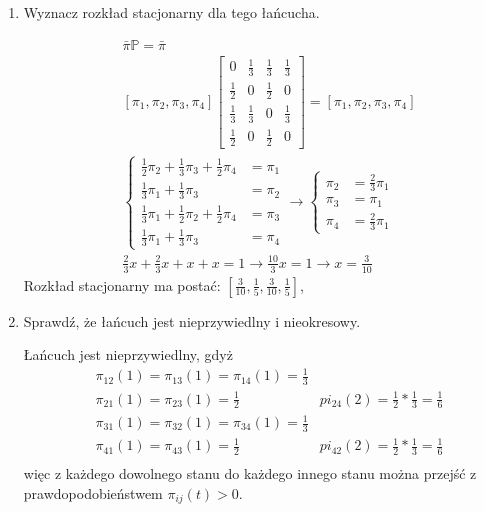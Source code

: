 \begin{enumerate}[label=\alph*)]
\item Wyznacz rozkład stacjonarny dla tego łańcucha.

\begin{align*}
&\bar{\pi}\mathbb{P}=\bar{\pi}\\
&\left[\pi _1, \pi _2,\pi _3,\pi _4\right]\begin{bmatrix}
0&\frac{1}{3}&\frac{1}{3}&\frac{1}{3}\\
\frac{1}{2}&0&\frac{1}{2}&0\\
\frac{1}{3}&\frac{1}{3}&0&\frac{1}{3}\\
\frac{1}{2}&0&\frac{1}{2}&0
\end{bmatrix}=\left[\pi _1, \pi _2,\pi _3,\pi _4\right]\\
&\left\{\begin{matrix}
\frac{1}{2}\pi _2 + \frac{1}{3}\pi _3+\frac{1}{2}\pi _4&=\pi _1\\
\frac{1}{3}\pi _1+\frac{1}{3}\pi _3&=\pi _2\\
\frac{1}{3}\pi _1+\frac{1}{2}\pi _2 +\frac{1}{2}\pi _4&=\pi _3\\
\frac{1}{3}\pi _1+\frac{1}{3}\pi _3&=\pi _4
\end{matrix}\right.\rightarrow \left\{\begin{matrix}
\pi _2 &= \frac{2}{3}\pi _1\\
\pi _3 &= \pi _1\\
\pi _4 &= \frac{2}{3}\pi _1
\end{matrix}\right.\\
&\frac{2}{3}x+\frac{2}{3}x+x+x=1\rightarrow \frac{10}{3}x=1\rightarrow x = \frac{3}{10}
\end{align*}
Rozkład stacjonarny ma postać: $\left[\frac{3}{10},\frac{1}{5},\frac{3}{10},\frac{1}{5}\right]$, 
\item Sprawdź, że łańcuch jest nieprzywiedlny i nieokresowy.

Łańcuch jest nieprzywiedlny, gdyż 
\begin{align*}
&\pi _{12}(1)=\pi _{13}(1)=\pi _{14}(1)=\frac{1}{3}\\
&\pi _{21}(1)=\pi _{23}(1)=\frac{1}{2} & pi _{24}(2)=\frac{1}{2}*\frac{1}{3}=\frac{1}{6}\\
&\pi _{31}(1)=\pi _{32}(1)=\pi _{34}(1)=\frac{1}{3}\\
&\pi _{41}(1)=\pi _{43}(1)=\frac{1}{2} & pi _{42}(2)=\frac{1}{2}*\frac{1}{3}=\frac{1}{6}\\
\end{align*}
więc z każdego dowolnego stanu do każdego innego stanu można przejść z prawdopodobieństwem $\pi _{ij}(t)>0$.


\end{enumerate}
